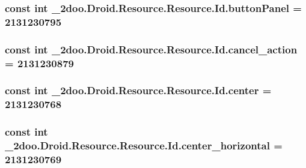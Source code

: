 \hypertarget{class__2doo_1_1_droid_1_1_resource_1_1_id_5fd50c453c6ec2189b281dbf934485a3}{
\subsubsection[{buttonPanel}]{\setlength{\rightskip}{0pt plus 5cm}const int \_\-2doo.Droid.Resource.Resource.Id.buttonPanel = 2131230795}}
\label{class__2doo_1_1_droid_1_1_resource_1_1_id_5fd50c453c6ec2189b281dbf934485a3}


\hypertarget{class__2doo_1_1_droid_1_1_resource_1_1_id_1f1f6edaf5b1c636e82347fcebde017d}{
\subsubsection[{cancel\_\-action}]{\setlength{\rightskip}{0pt plus 5cm}const int \_\-2doo.Droid.Resource.Resource.Id.cancel\_\-action = 2131230879}}
\label{class__2doo_1_1_droid_1_1_resource_1_1_id_1f1f6edaf5b1c636e82347fcebde017d}


\hypertarget{class__2doo_1_1_droid_1_1_resource_1_1_id_008355d44756b4d3abfbb912ce27a5c0}{
\subsubsection[{center}]{\setlength{\rightskip}{0pt plus 5cm}const int \_\-2doo.Droid.Resource.Resource.Id.center = 2131230768}}
\label{class__2doo_1_1_droid_1_1_resource_1_1_id_008355d44756b4d3abfbb912ce27a5c0}


\hypertarget{class__2doo_1_1_droid_1_1_resource_1_1_id_f15fb9b19068a3d454d9c8f7e5331896}{
\subsubsection[{center\_\-horizontal}]{\setlength{\rightskip}{0pt plus 5cm}const int \_\-2doo.Droid.Resource.Resource.Id.center\_\-horizontal = 2131230769}}
\label{class__2doo_1_1_droid_1_1_resource_1_1_id_f15fb9b19068a3d454d9c8f7e5331896}


